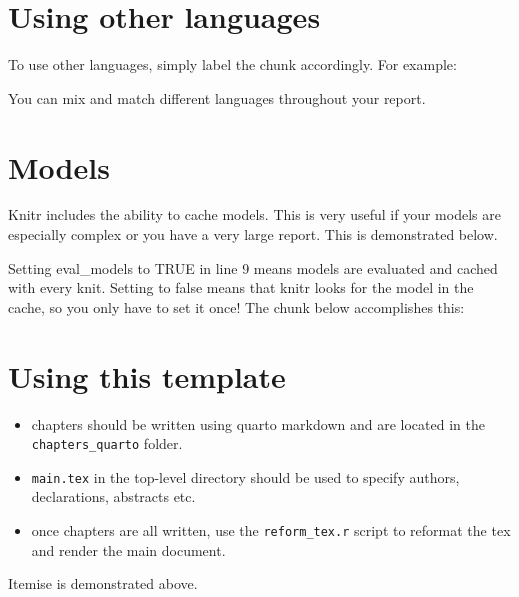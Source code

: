 \documentclass[../main.tex]{subfiles}
\begin{document}
\hypertarget{using-other-languages}{%
\section{Using other languages}\label{using-other-languages}}

To use other languages, simply label the chunk accordingly. For example:

You can mix and match different languages throughout your report.

\hypertarget{models}{%
\section{Models}\label{models}}

Knitr includes the ability to cache models. This is very useful if your
models are especially complex or you have a very large report. This is
demonstrated below.

Setting eval\_models to TRUE in line 9 means models are evaluated and
cached with every knit. Setting to false means that knitr looks for the
model in the cache, so you only have to set it once! The chunk below
accomplishes this:

\hypertarget{using-this-template}{%
\section{Using this template}\label{using-this-template}}

\begin{itemize}
\tightlist
\item
  chapters should be written using quarto markdown and are located in
  the \texttt{chapters\_quarto} folder.
\item
  \texttt{main.tex} in the top-level directory should be used to specify
  authors, declarations, abstracts etc.
\item
  once chapters are all written, use the \texttt{reform\_tex.r} script
  to reformat the tex and render the main document.
\end{itemize}

Itemise is demonstrated above.
\end{document}
